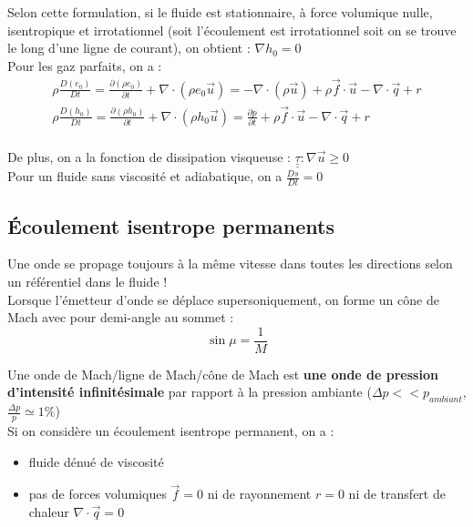 \documentclass[../main.tex]{subfiles}
\begin{document}
Selon cette formulation, si le fluide est stationnaire, à force volumique nulle, isentropique et irrotationnel (soit l'écoulement est irrotationnel soit on se trouve le long d'une ligne de courant), on obtient : $\nabla h_0 = 0$\\

Pour les gaz parfaits, on a : \begin{equation}
    \begin{gathered}
        \rho \frac{D(e_0)}{Dt} = \frac{\partial(\rho e_0)}{\partial t} + \nabla \cdot (\rho e_0 \Vec{u}) = -\nabla \cdot (\rho \Vec{u}) + \rho \Vec{f} \cdot \Vec{u} - \nabla \cdot \Vec{q} + r\\
        \rho \frac{D(h_0)}{Dt} = \frac{\partial(\rho h_0)}{\partial t} + \nabla \cdot (\rho h_0 \Vec{u}) = \frac{\partial p}{\partial t} + \rho \Vec{f} \cdot \Vec{u} - \nabla \cdot \Vec{q} + r\\
    \end{gathered}
\end{equation}

De plus, on a la fonction de dissipation visqueuse : $\underline{\underline{\tau}}:\nabla \Vec{u} \geq 0$\\

Pour un fluide sans viscosité et adiabatique, on a $\frac{Ds}{Dt} = 0$\\

\subsection{Écoulement isentrope permanents}
\warning Une onde se propage toujours à la même vitesse dans toutes les directions selon un référentiel dans le fluide !\\

Lorsque l'émetteur d'onde se déplace supersoniquement, on forme un cône de Mach avec pour demi-angle au sommet : \begin{equation}
    \sin \mu = \frac{1}{M}
\end{equation}

Une onde de Mach/ligne de Mach/cône de Mach est \textbf{une onde de pression d'intensité infinitésimale} par rapport à la pression ambiante ($\Delta p << p_{ambiant}$, $\frac{\Delta p}{p} \simeq 1\%$)\\

Si on considère un écoulement isentrope permanent, on a : \begin{itemize}
    \item fluide dénué de viscosité\\
    \item pas de forces volumiques $\Vec{f} = 0$ ni de rayonnement $r=0$ ni de transfert de chaleur $\nabla \cdot \Vec{q}=0$\\
\end{itemize}
\end{document}
